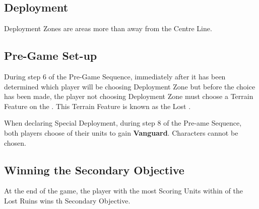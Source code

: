 
\label{LostRuins}


\subsection*{Deployment}

Deployment Zones are areas more than  away from the Centre Line.


\subsection*{Pre-Game Set-up}

During step 6 of the Pre-Game Sequence, immediately after it has been determined which player will be choosing  Deployment Zone but before the choice has been made, the player not choosing  Deployment Zone must choose a  Terrain Feature on the . This Terrain Feature is known as the Lost .

When declaring Special Deployment, during step 8 of the Pre-ame Sequence, both players  choose  of their units  to gain \textbf{Vanguard}.  Characters cannot be chosen.

\subsection*{Winning the Secondary Objective}

At the end of the game, the player with the most Scoring Units within  of the Lost Ruins wins th Secondary Objective.
